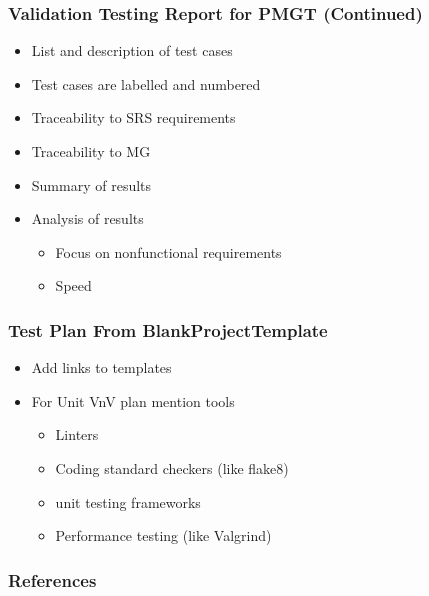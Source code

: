 \documentclass[t,12pt,numbers,fleqn]{beamer}
\begin{document}

\begin{frame}
\frametitle{Validation Testing Report for PMGT (Continued)}
\begin{itemize}
\item List and description of test cases
\item Test cases are labelled and numbered
\item Traceability to SRS requirements
\item Traceability to MG
\item Summary of results
\item Analysis of results
\begin{itemize}
\item Focus on nonfunctional requirements
\item Speed
\end{itemize}
\end{itemize}
\end{frame}


\begin{frame}
  \frametitle{Test Plan From BlankProjectTemplate}

  \begin{itemize}
  \item Add links to templates
  \item For Unit VnV plan mention tools
    \begin{itemize}
    \item Linters
    \item Coding standard checkers (like flake8)
    \item unit testing frameworks
    \item Performance testing (like Valgrind)
    \end{itemize}
  \end{itemize}
\end{frame}


\begin{frame}[allowframebreaks]
\frametitle{References}



\end{frame}

\end{document}
